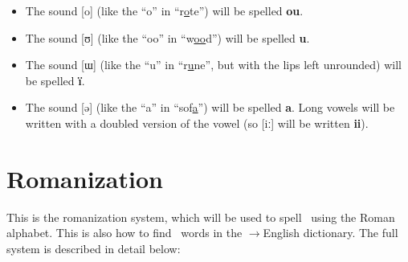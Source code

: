 \begin{itemize}
\item
The sound [o] (like the ``o'' in ``r\uline{o}te'') will be spelled \textbf{ou}.
\item
The sound [ʊ] (like the ``oo'' in ``w\uline{oo}d'') will be spelled \textbf{u}.
\item
The sound [ɯ] (like the ``u'' in ``r\uline{u}ne'', but with the lips left unrounded) will be spelled \textbf{ï}.
\item
The sound [ǝ] (like the ``a'' in ``sof\uline{a}'') will be spelled \textbf{a}.
Long vowels will be written with a doubled version of the vowel (so [iː] will be written \textbf{ii}).
\end{itemize}

\section{Romanization}

This is the romanization system, which will be used to spell \LanguageName\ using the Roman alphabet.
This is also how to find \LanguageName\ words in the \LanguageName$\rightarrow$English dictionary.
The full system is described in detail below:

